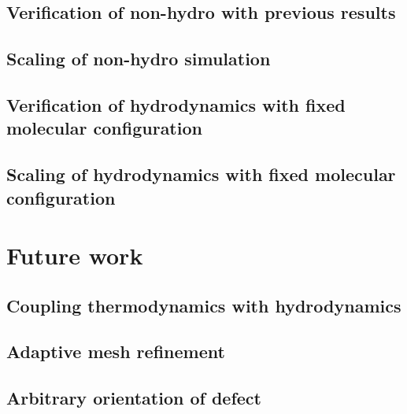 \documentclass[reqno]{article}
\begin{document}
  \subsection{Verification of non-hydro with previous results}
  \subsection{Scaling of non-hydro simulation}
  \subsection{Verification of hydrodynamics with fixed molecular configuration}
  \subsection{Scaling of hydrodynamics with fixed molecular configuration}

  \section{Future work}
  \subsection{Coupling thermodynamics with hydrodynamics}
  \subsection{Adaptive mesh refinement}
  \subsection{Arbitrary orientation of defect}
	
\end{document}
